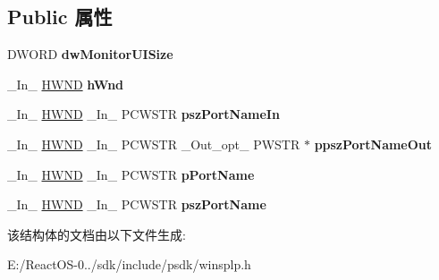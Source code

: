 \subsection*{Public 属性}
\begin{DoxyCompactItemize}
\item 
\mbox{\label{struct___m_o_n_i_t_o_r_u_i_a78c7ceabe5197af40c9913416a0b4ce5}} 
D\+W\+O\+RD {\bfseries dw\+Monitor\+U\+I\+Size}
\item 
\mbox{\label{struct___m_o_n_i_t_o_r_u_i_a96fdad10f7423caea3a4ad1ab8e4a76e}} 
\+\_\+\+In\+\_\+ \hyperlink{interfacevoid}{H\+W\+ND} {\bfseries h\+Wnd}
\item 
\mbox{\label{struct___m_o_n_i_t_o_r_u_i_ab9e67f3718dc80d30a7d11f2f1955e52}} 
\+\_\+\+In\+\_\+ \hyperlink{interfacevoid}{H\+W\+ND} \+\_\+\+In\+\_\+ P\+C\+W\+S\+TR {\bfseries psz\+Port\+Name\+In}
\item 
\mbox{\label{struct___m_o_n_i_t_o_r_u_i_a72407b5ff36b6449d2473dc53d741204}} 
\+\_\+\+In\+\_\+ \hyperlink{interfacevoid}{H\+W\+ND} \+\_\+\+In\+\_\+ P\+C\+W\+S\+TR \+\_\+\+Out\+\_\+opt\+\_\+ P\+W\+S\+TR $\ast$ {\bfseries ppsz\+Port\+Name\+Out}
\item 
\mbox{\label{struct___m_o_n_i_t_o_r_u_i_a98f69c0f1fddade4c7c3321be206f941}} 
\+\_\+\+In\+\_\+ \hyperlink{interfacevoid}{H\+W\+ND} \+\_\+\+In\+\_\+ P\+C\+W\+S\+TR {\bfseries p\+Port\+Name}
\item 
\mbox{\label{struct___m_o_n_i_t_o_r_u_i_aa4930005e9c3bbb0da5b1c0da3cf6f78}} 
\+\_\+\+In\+\_\+ \hyperlink{interfacevoid}{H\+W\+ND} \+\_\+\+In\+\_\+ P\+C\+W\+S\+TR {\bfseries psz\+Port\+Name}
\end{DoxyCompactItemize}


该结构体的文档由以下文件生成\+:\begin{DoxyCompactItemize}
\item 
E\+:/\+React\+O\+S-\/0../sdk/include/psdk/winsplp.\+h\end{DoxyCompactItemize}

